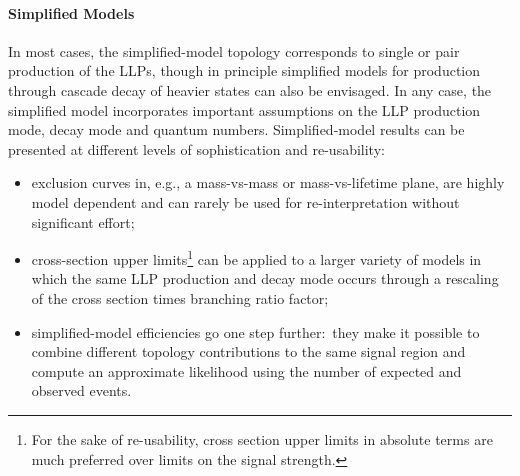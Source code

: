 \paragraph{Simplified Models}%
In most cases, the simplified-model topology corresponds to single or pair
production of the LLPs, though in principle simplified models for production
through cascade decay of heavier states can also be envisaged. 
In any case, the simplified model incorporates important assumptions 
on the LLP production mode, decay mode and quantum numbers. 
Simplified-model results can be presented at different levels of sophistication and re-usability:
\begin{itemize}
\item exclusion curves in, e.g., a mass-vs-mass or mass-vs-lifetime plane, are highly model dependent and can 
rarely be used for re-interpretation without significant effort;
\item cross-section upper limits\footnote{For the sake of re-usability, cross section upper limits in absolute terms are much preferred over limits on the signal strength.} 
can be applied to a larger variety of models
in which the same LLP production and decay mode occurs 
through a rescaling of the cross section times branching 
ratio factor; 
\item simplified-model efficiencies go one step further:~they make
it possible to combine different topology contributions to the same signal
region and compute an approximate likelihood using the number of expected and
observed events.
\end{itemize} 

